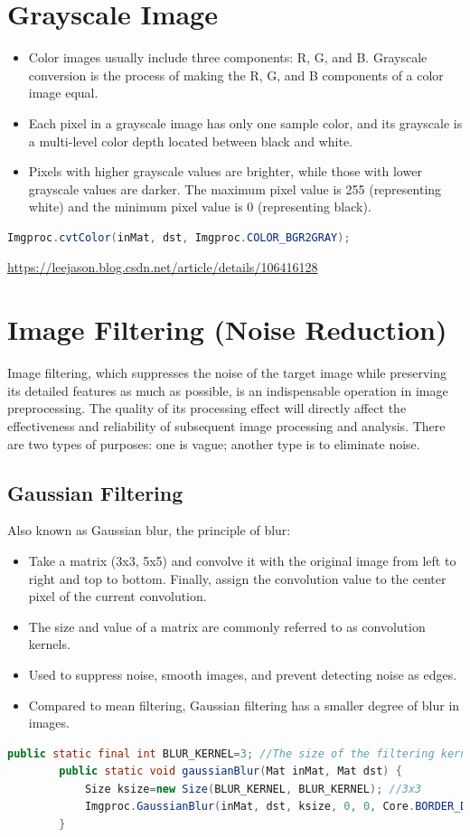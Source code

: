 \documentclass{article}
\begin{document}
	\section{Grayscale Image}
	\begin{itemize}
		\item Color images usually include three components: R, G, and B. Grayscale conversion is the process of making the R, G, and B components of a color image equal.
		\item Each pixel in a grayscale image has only one sample color, and its grayscale is a multi-level color depth located between black and white.
		\item Pixels with higher grayscale values are brighter, while those with lower grayscale values are darker. The maximum pixel value is 255 (representing white) and the minimum pixel value is 0 (representing black).
	\end{itemize}
	\begin{lstlisting}[language=Java]
		Imgproc.cvtColor(inMat, dst, Imgproc.COLOR_BGR2GRAY);
	\end{lstlisting}
	
	\url{https://leejason.blog.csdn.net/article/details/106416128}
	
	\section{Image Filtering (Noise Reduction)}
	Image filtering, which suppresses the noise of the target image while preserving its detailed features as much as possible, is an indispensable operation in image preprocessing. The quality of its processing effect will directly affect the effectiveness and reliability of subsequent image processing and analysis. There are two types of purposes: one is vague; another type is to eliminate noise.
	
	\subsection{Gaussian Filtering}
	Also known as Gaussian blur, the principle of blur:
	\begin{itemize}
		\item Take a matrix (3x3, 5x5) and convolve it with the original image from left to right and top to bottom. Finally, assign the convolution value to the center pixel of the current convolution.
		\item The size and value of a matrix are commonly referred to as convolution kernels.
		\item Used to suppress noise, smooth images, and prevent detecting noise as edges.
		\item Compared to mean filtering, Gaussian filtering has a smaller degree of blur in images.
	\end{itemize}
	\begin{lstlisting}[language=Java]
		public static final int BLUR_KERNEL=3; //The size of the filtering kernel must be a positive odd number
		public static void gaussianBlur(Mat inMat, Mat dst) {
			Size ksize=new Size(BLUR_KERNEL, BLUR_KERNEL); //3x3
			Imgproc.GaussianBlur(inMat, dst, ksize, 0, 0, Core.BORDER_DEFAULT);
		}
	\end{lstlisting}
	
\end{document}
